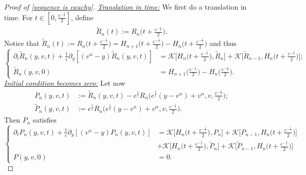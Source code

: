 \documentclass[11pt]{article}
\numberwithin{equation}{section}
\begin{document}
\begin{proof}[Proof of \eqref{sequence is cauchy}]
\textit{\underline{Translation in time:}} We first do a translation in time. For $t\in [0,\frac{e^{-\frac{1}{\epsilon}}}{2}]$, define 
\begin{align*}
 \tilde{R}_{n}(t):=R_{n}\bigg(t+\frac{e^{-\frac{1}{\epsilon}}}{2}\bigg).
    \end{align*}
    Notice that $\tilde{R}_{n}(t):=R_{n}\bigg(t+\frac{e^{-\frac{1}{\epsilon}}}{2}\bigg)=H_{n+1}\bigg(t+\frac{e^{-\frac{1}{\epsilon}}}{2}\bigg)-H_{n}\bigg(t+\frac{e^{-\frac{1}{\epsilon}}}{2}\bigg)$ and thus
    \begin{equation}\label{tilde rn}
\left\{\begin{aligned}
\partial_t \tilde{R}_n(y,v,t)+\frac{1}{\epsilon}\partial_y[(v^{\alpha}-y) \tilde{R}_n(y,v,t)]&=\mathcal{K}\bigg[H_{n}\bigg(t+\frac{e^{-\frac{1}{\epsilon}}}{2}\bigg),\tilde{R}_n\bigg]+\mathcal{K}\bigg[\tilde{R}_{n-1},H_{n}\bigg(t+\frac{e^{-\frac{1}{\epsilon}}}{2}\bigg)\bigg]; \\
\tilde{R}_{n}(y,v,0)&=H_{n+1}\bigg(\frac{e^{-\frac{1}{\epsilon}}}{2}\bigg)-H_{n}\bigg(\frac{e^{-\frac{1}{\epsilon}}}{2}\bigg).
   \end{aligned}\right.
   \end{equation}
    \textit{\underline{Initial condition becomes zero:}}    Let now
   \begin{align*}
       P_{n}(y,v,t)&:=\tilde{R}_{n}(y,v,t)-e^{\frac{t}{\epsilon}}R_{n}\bigg(e^{\frac{t}{\epsilon}}(y-v^{\alpha})+v^{\alpha},v,\frac{e^{-\frac{1}{\epsilon}}}{2}\bigg);  \\
       \tilde{P}_{n}(y,v,t)&:=e^{\frac{t}{\epsilon}}R_{n}\bigg(e^{\frac{t}{\epsilon}}(y-v^{\alpha})+v^{\alpha},v,\frac{e^{-\frac{1}{\epsilon}}}{2}\bigg).
   \end{align*}
   Then $P_{n}$ satisfies
   \begin{equation}\label{equation pn}
\left\{\begin{aligned}
\partial_t P_n(y,v,t)+\frac{1}{\epsilon}\partial_{y}[(v^{\alpha}-y) P_n(y,v,t)]&=\mathcal{K}\bigg[H_{n}\bigg(t+\frac{e^{-\frac{1}{\epsilon}}}{2}\bigg),P_n\bigg]+\mathcal{K}\bigg[P_{n-1},H_{n}\bigg(t+\frac{e^{-\frac{1}{\epsilon}}}{2}\bigg)\bigg] \\
&+\mathcal{K}\bigg[H_{n}\bigg(t+\frac{e^{-\frac{1}{\epsilon}}}{2}\bigg), \tilde{P}_{n}\bigg]+\mathcal{K}\bigg[ \tilde{P}_{n-1},H_{n}\bigg(t+\frac{e^{-\frac{1}{\epsilon}}}{2}\bigg)\bigg]\\
P(y,v,0)&=0.
   \end{aligned}\right.
   \end{equation}


\end{proof}
\end{document}
